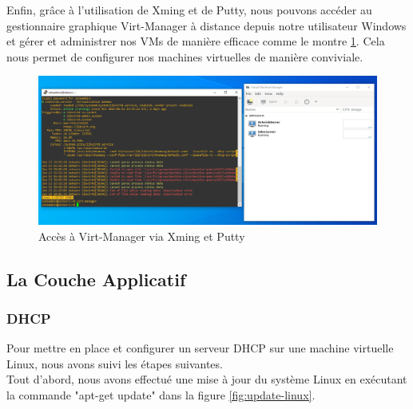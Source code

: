 Enfin, grâce à l'utilisation de Xming et de Putty, nous pouvons accéder au gestionnaire graphique Virt-Manager à distance depuis notre utilisateur Windows et gérer et administrer nos VMs de manière efficace comme le montre \ref{fig:virt-manager-access}. Cela nous permet de configurer nos machines virtuelles de manière conviviale. \\


\begin{figure}[H]
 \centering
    \includegraphics[width=15cm]{Images/resultvirtmanager.png}
    \caption{Accès à Virt-Manager via Xming et Putty}
    \label{fig:virt-manager-access}
\end{figure}



\subsection{La Couche Applicatif}


\subsubsection{DHCP}

Pour mettre en place et configurer un serveur DHCP sur une machine virtuelle Linux, nous avons suivi les étapes suivantes.\\

Tout d'abord, nous avons effectué une mise à jour du système Linux en exécutant la commande "apt-get update" dans la figure \ref{fig:update-linux}. \\

